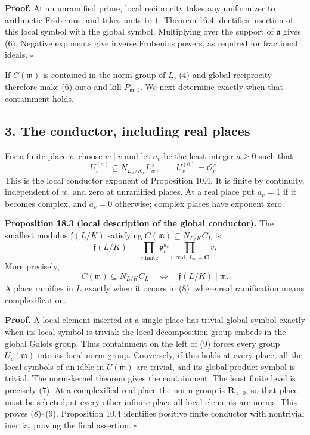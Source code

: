 \documentclass[11pt,a4paper]{article}
\begin{document}
\textbf{Proof.} At an unramified prime, local reciprocity takes any
uniformizer to arithmetic Frobenius, and takes units to \(1\). Theorem
16.4 identifies insertion of this local symbol with the global symbol.
Multiplying over the support of \(\mathfrak a\) gives (6). Negative
exponents give inverse Frobenius powers, as required for fractional
ideals. \(\square\)

If \(C(\mathfrak m)\) is contained in the norm group of \(L\), (4) and
global reciprocity therefore make (6) onto and kill
\(P_{\mathfrak m,1}\). We next determine exactly when that containment
holds.

\subsection{3. The conductor, including real
places}\label{the-conductor-including-real-places}

For a finite place \(v\), choose \(w\mid v\) and let \(a_v\) be the
least integer \(a\geq0\) such that \[
U_v^{(a)}\subseteq N_{L_w/K_v}L_w^\times,
\qquad U_v^{(0)}=\mathcal O_v^\times.
\tag{7}
\] This is the local conductor exponent of Proposition 10.4. It is
finite by continuity, independent of \(w\), and zero at unramified
places. At a real place put \(a_v=1\) if it becomes complex, and
\(a_v=0\) otherwise; complex places have exponent zero.

\textbf{Proposition 18.3 (local description of the global conductor).}
The smallest modulus \(\mathfrak f(L/K)\) satisfying
\(C(\mathfrak m)\subseteq N_{L/K}C_L\) is \[
\mathfrak f(L/K)=
\prod_{v\text{ finite}}\mathfrak p_v^{a_v}
\prod_{v\text{ real},\ L_w=\mathbf C}v.
\tag{8}
\] More precisely, \[
C(\mathfrak m)\subseteq N_{L/K}C_L
\quad\Longleftrightarrow\quad\mathfrak f(L/K)\mid\mathfrak m.
\tag{9}
\] A place ramifies in \(L\) exactly when it occurs in (8), where real
ramification means complexification.

\textbf{Proof.} A local element inserted at a single place has trivial
global symbol exactly when its local symbol is trivial: the local
decomposition group embeds in the global Galois group. Thus containment
on the left of (9) forces every group \(U_v(\mathfrak m)\) into its
local norm group. Conversely, if this holds at every place, all the
local symbols of an idèle in \(U(\mathfrak m)\) are trivial, and its
global product symbol is trivial. The norm-kernel theorem gives the
containment. The least finite level is precisely (7). At a complexified
real place the norm group is \(\mathbf R_{>0}\), so that place must be
selected; at every other infinite place all local elements are norms.
This proves (8)--(9). Proposition 10.4 identifies positive finite
conductor with nontrivial inertia, proving the final assertion.
\(\square\)
\end{document}
